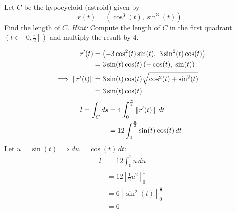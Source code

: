 \begin{exercise}
	Let $C$ be the hypocycloid (astroid) given by
	$$
		r(t) = (\cos^3(t), \sin^3(t)).
	$$
	Find the length of $C$.
	\emph{Hint:} Compute the length of $C$ in the first quadrant $(t \in [0, \frac{\pi}{2}])$ and multiply the result by 4.
\end{exercise}

\begin{solution}
	$$
		\begin{aligned}
			r'(t)                 & = \left( -3 \cos^2(t) \sin(t), \; 3 \sin^2(t) \cos(t) \right) \\
			                      & = 3 \sin(t) \cos(t) \left( -\cos(t), \; \sin(t) \right)       \\
			\implies \left\lVert r'(t) \right\rVert & = 3 \sin(t) \cos(t) \sqrt{\cos^2(t) + \sin^2(t)}              \\
			                      & = 3 \sin(t) \cos(t)
		\end{aligned}
	$$
	$$
		\begin{aligned}
			l = \int_C{ds} & = 4 \int_0^{\frac{\pi}{2}}{\left\lVert r'(t) \right\rVert \, dt}     \\
			               & = 12 \int_0^{\frac{\pi}{2}}{\sin(t) \cos(t) \, dt}
		\end{aligned}
	$$
	Let $u = \sin(t) \implies du = \cos(t) \, dt$:
	$$
		\begin{aligned}
			l & = 12 \int_0^{1}{u \, du}                         \\
			  & = 12 \left[ \frac{1}{2} u^2 \right]_{0}^{1}      \\
			  & = 6 \left[ \sin^2(t) \right]_{0}^{\frac{\pi}{2}} \\
			  & = 6
		\end{aligned}
	$$
\end{solution}
